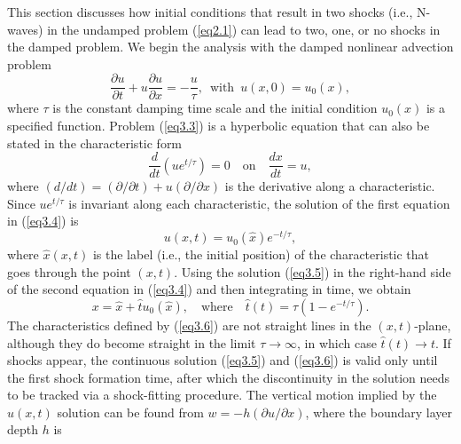 \documentclass[10pt]{article}
\begin{document}
     This section discusses how initial conditions that result in two
shocks (i.e., N-waves) in the undamped problem (\ref{eq2.1}) can lead
to two, one, or no shocks in the damped problem. We begin the analysis
with the damped nonlinear advection problem
\begin{equation}                                 %
        \frac{\partial u}{\partial t}
     + u\frac{\partial u}{\partial x} = -\frac{u}{\tau},
        \,\,\,\text{with}\,\,\,   u(x,0) = u_0(x),
\label{eq3.3}
\end{equation}
where $\tau$ is the constant damping time scale and the initial condition
$u_0(x)$ is a specified function. Problem (\ref{eq3.3}) is a hyperbolic
equation that can also be stated in the characteristic form
\begin{equation}                                 %
     \frac{d}{dt}\left(ue^{t/\tau}\right) = 0
              \quad \text{on} \quad \frac{dx}{dt} = u,
\label{eq3.4}
\end{equation}
where $(d/dt)=(\partial/\partial t)+u(\partial/\partial x)$ is the
derivative along a characteristic. Since $ue^{t/\tau}$ is invariant along
each characteristic, the solution of the first equation in (\ref{eq3.4})
is
\begin{equation}                                 %
     u(x,t) = u_0(\hat{x})e^{-t/\tau},
\label{eq3.5}
\end{equation}
where $\hat{x}(x,t)$ is the label (i.e., the initial position) of the
characteristic that goes through the point $(x,t)$. Using the solution
(\ref{eq3.5}) in the right-hand side of the second equation in (\ref{eq3.4})
and then integrating in time, we obtain
\begin{equation}                                 %
        x = \hat{x} + \hat{t} u_0(\hat{x}),
                     \quad \text{where} \quad
	\hat{t}(t) = \tau\left(1-e^{-t/\tau}\right).
\label{eq3.6}
\end{equation}
The characteristics defined by (\ref{eq3.6}) are not straight lines in the
$(x,t)$-plane, although they do become straight in the limit $\tau\to\infty$,
in which case $\hat{t}(t)\to t$.
If shocks appear, the continuous solution (\ref{eq3.5}) and (\ref{eq3.6})
is valid only until the first shock formation time, after which the
discontinuity in the solution needs to be tracked
 via a shock-fitting procedure. The
vertical motion implied by the $u(x,t)$ solution can be found from
$w=-h(\partial u/\partial x)$, where the boundary layer depth $h$ is
\end{document}
